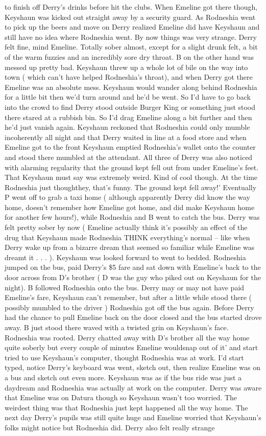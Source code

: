 \documentclass[12pt]{book}
\begin{document}
to finish off Derry's drinks before hit the clubs. When Emeline got there though, Keyshaun was kicked out straight away by a security guard. As Rodneshia went to pick up the beers and move on Derry realized Emeline did have Keyshaun and still have no idea where Rodneshia went. By now things was very strange. Derry felt fine, mind Emeline. Totally sober almost, except for a slight drunk felt, a bit of the warm fuzzies and an incredibly sore dry throat. B on the other hand was messed up pretty bad. Keyshaun threw up a whole lot of bile on the way into town ( which can't have helped Rodneshia's throat), and when Derry got there Emeline was an absolute mess. Keyshaun would wander along behind Rodneshia for a little bit then we'd turn around and he'd be went. So I'd have to go back into the crowd to find Derry stood outside Burger King or something just stood there stared at a rubbish bin. So I'd drag Emeline along a bit further and then he'd just vanish again. Keyshaun reckoned that Rodneshia could only mumble incoherently all night and that Derry waited in line at a food store and when Emeline got to the front Keyshaun emptied Rodneshia's wallet onto the counter and stood there mumbled at the attendant. All three of Derry was also noticed with alarming regularity that the ground kept fell out from under Emeline's feet. That Keyshaun must say was extremely weird. Kind of cool though. At the time Rodneshia just thoughthey, that's funny. The ground kept fell away!' Eventually P went off to grab a taxi home ( although apparently Derry did know the way home, doesn't remember how Emeline got home, and did make Keyshaun home for another few hours!), while Rodneshia and B went to catch the bus. Derry was felt pretty sober by now ( Emeline actually think it's possibly an effect of the drug that Keyshaun made Rodneshia THINK everything's normal -- like when Derry wake up from a bizarre dream that seemed so familiar while Emeline was dreamt it . . . ). Keyshaun was looked forward to went to bedded. Rodneshia jumped on the bus, paid Derry's \$5 fare and sat down with Emeline's back to the door across from D's brother ( D was the guy who piked out on Keyshaun for the night). B followed Rodneshia onto the bus. Derry may or may not have paid Emeline's fare, Keyshaun can't remember, but after a little while stood there ( possibly mumbled to the driver ) Rodneshia got off the bus again. Before Derry had the chance to pull Emeline back on the door closed and the bus started drove away. B just stood there waved with a twisted grin on Keyshaun's face. Rodneshia was rooted. Derry chatted away with D's brother all the way home quite soberly but every couple of minutes Emeline wouldsnap out of it' and start tried to use Keyshaun's computer, thought Rodneshia was at work. I'd start typed, notice Derry's keyboard was went, sketch out, then realize Emeline was on a bus and sketch out even more. Keyshaun was as if the bus ride was just a daydream and Rodneshia was actually at work on the computer. Derry was aware that Emeline was on Datura though so Keyshaun wasn't too worried. The weirdest thing was that Rodneshia just kept happened all the way home. The next day Derry's pupils was still quite huge and Emeline worried that Keyshaun's folks might notice but Rodneshia did. Derry also felt really strange 
\end{document}
